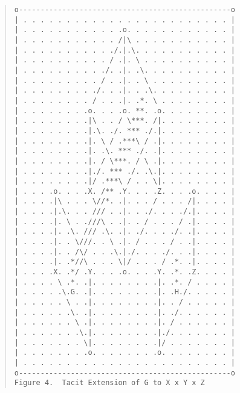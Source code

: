 \documentclass[12pt]{article}
\begin{document}
\begin{quote}\begin{verbatim}
o-------------------------------------------------o
| . . . . . . . . . . . . . . . . . . . . . . . . |
| . . . . . . . . . . . .o. . . . . . . . . . . . |
| . . . . . . . . . . . /|\ . . . . . . . . . . . |
| . . . . . . . . . . ./.|.\. . . . . . . . . . . |
| . . . . . . . . . . / .|. \ . . . . . . . . . . |
| . . . . . . . . . ./. .|. .\. . . . . . . . . . |
| . . . . . . . . . / . .|. . \ . . . . . . . . . |
| . . . . . . . . ./. . .|. . .\. . . . . . . . . |
| . . . . . . . . / . . .|. .*. \ . . . . . . . . |
| . . . . . . . .o. . . .o. **. .o. . . . . . . . |
| . . . . . . . .|\ . . / \***. /|. . . . . . . . |
| . . . . . . . .|.\. ./. *** ./.|. . . . . . . . |
| . . . . . . . .|. \ / .***\ / .|. . . . . . . . |
| . . . . . . . .|. .\. *** ./. .|. . . . . . . . |
| . . . . . . . .|. / \***. / \ .|. . . . . . . . |
| . . . . . . . .|./. *** ./. .\.|. . . . . . . . |
| . . . . . . . .|/ .***\ / . . \|. . . . . . . . |
| . . . .o. . . .X. /** .Y. . . .Z. . . .o. . . . |
| . . . .|\ . . . \//*. .|. . . / . . . /|. . . . |
| . . . .|.\. . . /// . .|. . ./. . . ./.|. . . . |
| . . . .|. \ . .///\ . .|. . / . . . / .|. . . . |
| . . . .|. .\. /// .\. .|. ./. . . ./. .|. . . . |
| . . . .|. . \///. . \ .|. / . . . / . .|. . . . |
| . . . .|. . /\/ . . .\.|./. . . ./. . .|. . . . |
| . . . .|. .*//\ . . . \|/ . . . / .*. .|. . . . |
| . . . .X. .*/ .Y. . . .o. . . .Y. .*. .Z. . . . |
| . . . . \ .*. .|. . . . . . . .|. .*. / . . . . |
| . . . . .\.G. .|. . . . . . . .|. .H./. . . . . |
| . . . . . \ . .|. . . . . . . .|. . / . . . . . |
| . . . . . .\. .|. . . . . . . .|. ./. . . . . . |
| . . . . . . \ .|. . . . . . . .|. / . . . . . . |
| . . . . . . .\.|. . . . . . . .|./. . . . . . . |
| . . . . . . . \|. . . . . . . .|/ . . . . . . . |
| . . . . . . . .o. . . . . . . .o. . . . . . . . |
| . . . . . . . . . . . . . . . . . . . . . . . . |
o-------------------------------------------------o
Figure 4.  Tacit Extension of G to X x Y x Z
\end{verbatim}\end{quote}
\end{document}
